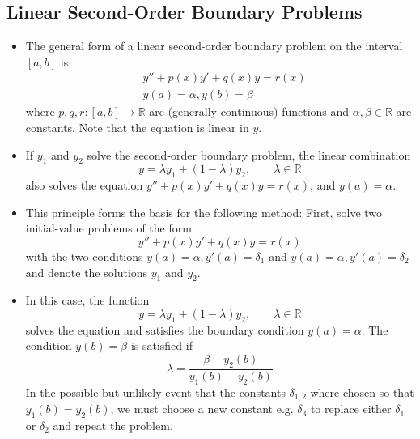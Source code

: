 \documentclass[11pt, a4paper]{article}
\newcommand{\R}{\mathbb{R}} %
\begin{document}
\subsection{Linear Second-Order Boundary Problems}
\begin{itemize}
	\item The general form of a linear second-order boundary problem on the interval $ [a, b] $ is
	\begin{align*}
		&y'' + p(x)y' + q(x) y = r(x)\\
		&y(a) = \alpha, y(b) = \beta
	\end{align*}
	where $ p, q, r: [a, b] \to \R$ are (generally continuous) functions and $ \alpha, \beta \in \R $ are constants. Note that the equation is linear in $ y $.
	
	\item If $ y_{1} $ and $ y_{2} $ solve the second-order boundary problem, the linear combination 
	\begin{equation*}
		y = \lambda y_{1} + (1 - \lambda) y_{2},  \qquad \lambda \in \R
	\end{equation*}
	also solves the equation $ y'' + p(x)y' + q(x) y = r(x) $, and $ y(a) = \alpha$. 
	
	\item This principle forms the basis for the following method: First, solve two initial-value problems of the form
	\begin{equation*}
		y'' + p(x)y' + q(x) y = r(x)
	\end{equation*}
	with the two conditions $ y(a) = \alpha, y'(a) = \delta_{1}$ and $ y(a) = \alpha, y'(a) = \delta_{2} $ and denote the solutions $ y_{1} $ and $ y_{2} $. 
	
 	\item  In this case, the function
 	\begin{equation*}
		y = \lambda y_{1} + (1 - \lambda) y_{2},  \qquad \lambda \in \R
	\end{equation*}
	solves the equation and satisfies the boundary condition $ y(a) = \alpha $. The condition $ y(b) = \beta $ is satisfied if
	\begin{equation*}
		\lambda = \frac{\beta - y_{2}(b)}{y_{1}(b) - y_{2}(b)}
	\end{equation*}
	In the possible but unlikely event that the constants $ \delta_{1, 2} $ where chosen so that $ y_{1}(b) = y_{2}(b) $, we must choose a new constant e.g. $ \delta_{3} $ to replace either $ \delta_{1}  $ or $ \delta_{2}  $ and repeat the problem.
\end{itemize}
\end{document}
